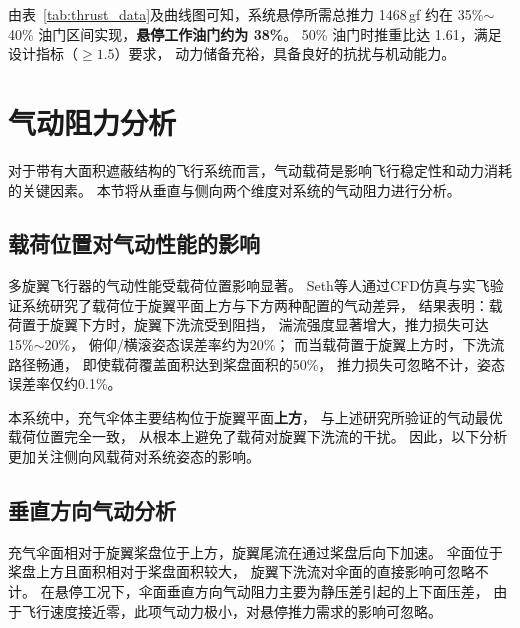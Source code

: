 由表~\ref{tab:thrust_data}及曲线图可知，系统悬停所需总推力 1468\,gf
约在 35\%$\sim$40\% 油门区间实现，\textbf{悬停工作油门约为 38\%}。
50\% 油门时推重比达 1.61，满足设计指标（$\geq 1.5$）要求，
动力储备充裕，具备良好的抗扰与机动能力。


\section{气动阻力分析}
对于带有大面积遮蔽结构的飞行系统而言，气动载荷是影响飞行稳定性和动力消耗的关键因素。
本节将从垂直与侧向两个维度对系统的气动阻力进行分析。

\subsection{载荷位置对气动性能的影响}
多旋翼飞行器的气动性能受载荷位置影响显著。
Seth等人通过CFD仿真与实飞验证系统研究了载荷位于旋翼平面上方与下方两种配置的气动差异，
结果表明：载荷置于旋翼下方时，旋翼下洗流受到阻挡，
湍流强度显著增大，推力损失可达15\%$\sim$20\%，
俯仰/横滚姿态误差率约为20\%；
而当载荷置于旋翼上方时，下洗流路径畅通，
即使载荷覆盖面积达到桨盘面积的50\%，
推力损失可忽略不计，姿态误差率仅约0.1\%\cite{seth2023}。

本系统中，充气伞体主要结构位于旋翼平面\textbf{上方}，
与上述研究所验证的气动最优载荷位置完全一致，
从根本上避免了载荷对旋翼下洗流的干扰。
因此，以下分析更加关注侧向风载荷对系统姿态的影响。

\subsection{垂直方向气动分析}
充气伞面相对于旋翼桨盘位于上方，旋翼尾流在通过桨盘后向下加速。
伞面位于桨盘上方且面积相对于桨盘面积较大，
旋翼下洗流对伞面的直接影响可忽略不计。
在悬停工况下，伞面垂直方向气动阻力主要为静压差引起的上下面压差，
由于飞行速度接近零，此项气动力极小，对悬停推力需求的影响可忽略。

